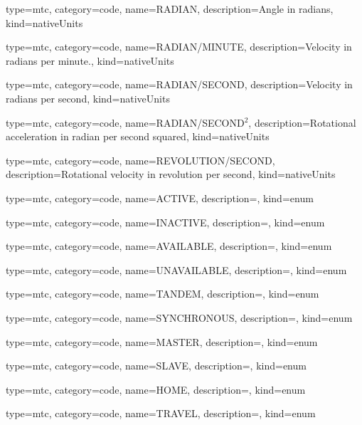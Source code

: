 {
  type=mtc,
  category=code,
  name={RADIAN},
  description={Angle in radians},
  kind={nativeUnits}
}


{
  type=mtc,
  category=code,
  name={RADIAN/MINUTE},
  description={Velocity in radians per minute.},
  kind={nativeUnits}
}


{
  type=mtc,
  category=code,
  name={RADIAN/SECOND},
  description={Velocity in radians per second},
  kind={nativeUnits}
}


{
  type=mtc,
  category=code,
  name={RADIAN/SECOND$^2$},
  description={Rotational acceleration in radian per second squared},
  kind={nativeUnits}
}


{
  type=mtc,
  category=code,
  name={REVOLUTION/SECOND},
  description={Rotational velocity in revolution per second},
  kind={nativeUnits}
}


{
  type=mtc,
  category=code,
  name={ACTIVE},
  description={},
  kind={enum}
}


{
  type=mtc,
  category=code,
  name={INACTIVE},
  description={},
  kind={enum}
}


{
  type=mtc,
  category=code,
  name={AVAILABLE},
  description={},
  kind={enum}
}


{
  type=mtc,
  category=code,
  name={UNAVAILABLE},
  description={},
  kind={enum}
}


{
  type=mtc,
  category=code,
  name={TANDEM},
  description={},
  kind={enum}
}


{
  type=mtc,
  category=code,
  name={SYNCHRONOUS},
  description={},
  kind={enum}
}


{
  type=mtc,
  category=code,
  name={MASTER},
  description={},
  kind={enum}
}


{
  type=mtc,
  category=code,
  name={SLAVE},
  description={},
  kind={enum}
}


{
  type=mtc,
  category=code,
  name={HOME},
  description={},
  kind={enum}
}


{
  type=mtc,
  category=code,
  name={TRAVEL},
  description={},
  kind={enum}
}


